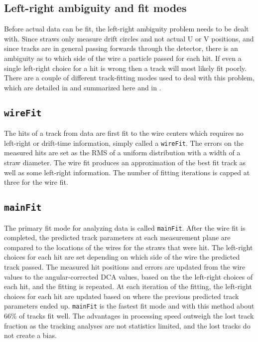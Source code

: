 \subsection{Left-right ambiguity and fit modes}
\label{sub:leftright}


Before actual data can be fit, the left-right ambiguity problem needs to be dealt with. Since straws only measure drift circles and not actual U or V positions, and since tracks are in general passing forwards through the detector, there is an ambiguity as to which side of the wire a particle passed for each hit. If even a single left-right choice for a hit is wrong then a track will most likely fit poorly. There are a couple of different track-fitting modes used to deal with this problem, which are detailed in  and summarized here and in .

\subsection*{\texttt{wireFit}}

The hits of a track from data are first fit to the wire centers which requires no left-right or drift-time information, simply called a \texttt{wireFit}. The errors on the measured hits are set as the RMS of a uniform distribution with a width of a straw diameter. The wire fit produces an approximation of the best fit track as well as some left-right information. The number of fitting iterations is capped at three for the wire fit.

\subsection*{\texttt{mainFit}}

The primary fit mode for analyzing data is called \texttt{mainFit}. After the wire fit is completed, the predicted track parameters at each measurement plane are compared to the locations of the wires for the straws that were hit. The left-right choices for each hit are set depending on which side of the wire the predicted track passed. The measured hit positions and errors are updated from the wire values to the angular-corrected DCA values, based on the the left-right choices of each hit, and the fitting is repeated. At each iteration of the fitting, the left-right choices for each hit are updated based on where the previous predicted track parameters ended up. \texttt{mainFit} is the fastest fit mode and with this method about 66\% of tracks fit well. The advantages in processing speed outweigh the lost track fraction as the tracking analyses are not statistics limited, and the lost tracks do not create a bias.


